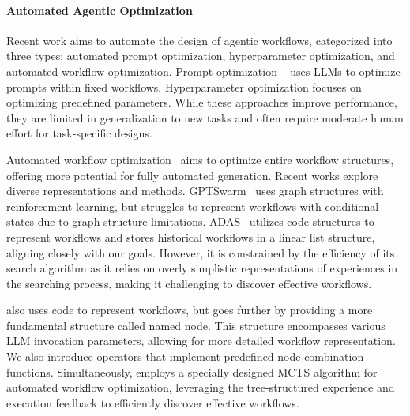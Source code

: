 \paragraph{Automated Agentic Optimization}
Recent work aims to automate the design of agentic workflows, categorized into three types: automated prompt optimization, hyperparameter optimization, and automated workflow optimization. Prompt optimization ~\citep{chirs2024probreed, mert2024text, cheng2024opro, omar2024dspy} uses LLMs to optimize prompts within fixed workflows. Hyperparameter optimization \citep{saad2024archon} focuses on optimizing predefined parameters. While these approaches improve performance, they are limited in generalization to new tasks and often require moderate human effort for task-specific designs.

Automated workflow optimization~\citep{ze2024autoflow, wang2024symbo, zhuge2024gptswarm, hu2024automated} aims to optimize entire workflow structures, offering more potential for fully automated generation. Recent works explore diverse representations and methods. GPTSwarm~\citep{zhuge2024gptswarm} uses graph structures with reinforcement learning, but struggles to represent workflows with conditional states due to graph structure limitations. ADAS~\citep{hu2024automated} utilizes code structures to represent workflows and stores historical workflows in a linear list structure, aligning closely with our goals. However, it is constrained by the efficiency of its search algorithm as it relies on overly simplistic representations of experiences in the searching process, making it challenging to discover effective workflows.

\model also uses code to represent workflows, but goes further by providing a more fundamental structure called named node.  This structure encompasses various LLM invocation parameters, allowing for more detailed workflow representation. We also introduce operators that implement predefined node combination functions. Simultaneously, \model employs a specially designed MCTS algorithm for automated workflow optimization, leveraging the tree-structured experience and execution feedback to efficiently discover effective workflows.

